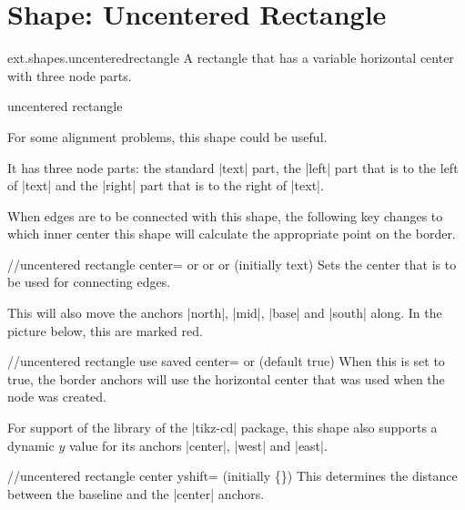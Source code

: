 %
%
%

\section{Shape: Uncentered Rectangle}
\begin{purepgflibrary}{ext.shapes.uncenteredrectangle}
  A rectangle that has a variable horizontal center with three node parts.
\end{purepgflibrary}
\begin{ext_shape}{uncentered rectangle}

For some alignment problems, this shape could be useful.

It has three node parts: the standard |text| part,
the |left| part that is to the left of |text|
and the |right| part that is to the right of |text|.

When edges are to be connected with this shape, the
following key changes to which inner center this shape will
calculate the appropriate point on the border.
\begin{key}{/\pgfext/uncentered rectangle center=\textrm{ or }\textrm{ or }\textrm{ or } (initially text)}
  Sets the center that is to be used for connecting edges.
  
  This will also move the anchors |north|, |mid|, |base| and |south| along.
  In the picture below, this are marked red.
\end{key}

\begin{key}{/\pgfext/uncentered rectangle use saved center=\textrm{ or } (default true)}
When this is set to true, the border anchors will use the horizontal center that was used when
the node was created.
\end{key}

For support of the  library of the |tikz-cd| package,
this shape also supports a dynamic $y$ value for its anchors |center|, |west| and |east|.
\begin{key}{/\pgfext/uncentered rectangle center yshift= (initially \{\})}
  This determines the distance between the baseline and the |center| anchors.
  

\end{key}
\end{ext_shape}
